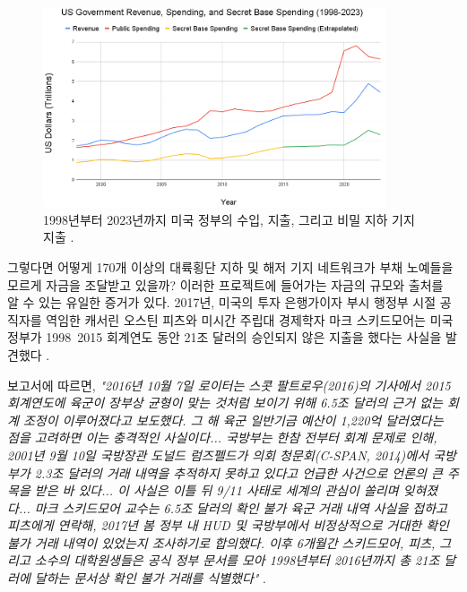 \documentclass[10pt,twocolumn,letterpaper]{article}
\begin{document}
\begin{figure}[t]
\begin{center}
\includegraphics[width=0.9\textwidth]{govcrop2.png}
\end{center}
   \caption{1998년부터 2023년까지 미국 정부의 수입, 지출, 그리고 비밀 지하 기지 지출 \cite{19}.}
   \label{fig:9}
\end{figure}

그렇다면 어떻게 170개 이상의 대륙횡단 지하 및 해저 기지 네트워크가 부채 노예들을 모르게 자금을 조달받고 있을까? 이러한 프로젝트에 들어가는 자금의 규모와 출처를 알 수 있는 유일한 증거가 있다. 2017년, 미국의 투자 은행가이자 부시 행정부 시절 공직자를 역임한 캐서린 오스틴 피츠와 미시간 주립대 경제학자 마크 스키드모어는 미국 정부가 1998~2015 회계연도 동안 21조 달러의 승인되지 않은 지출을 했다는 사실을 발견했다 \cite{11,12,13}.

보고서에 따르면, \textit{"2016년 10월 7일 로이터는 스콧 팔트로우(2016)의 기사에서 2015 회계연도에 육군이 장부상 균형이 맞는 것처럼 보이기 위해 6.5조 달러의 근거 없는 회계 조정이 이루어졌다고 보도했다. 그 해 육군 일반기금 예산이 1,220억 달러였다는 점을 고려하면 이는 충격적인 사실이다... 국방부는 한참 전부터 회계 문제로 인해, 2001년 9월 10일 국방장관 도널드 럼즈펠드가 의회 청문회(C-SPAN, 2014)에서 국방부가 2.3조 달러의 거래 내역을 추적하지 못하고 있다고 언급한 사건으로 언론의 큰 주목을 받은 바 있다... 이 사실은 이틀 뒤 9/11 사태로 세계의 관심이 쏠리며 잊혀졌다... 마크 스키드모어 교수는 6.5조 달러의 확인 불가 육군 거래 내역 사실을 접하고 피츠에게 연락해, 2017년 봄 정부 내 HUD 및 국방부에서 비정상적으로 거대한 확인 불가 거래 내역이 있었는지 조사하기로 합의했다. 이후 6개월간 스키드모어, 피츠, 그리고 소수의 대학원생들은 공식 정부 문서를 모아 1998년부터 2016년까지 총 21조 달러에 달하는 문서상 확인 불가 거래를 식별했다"} \cite{12}.
\end{document}
